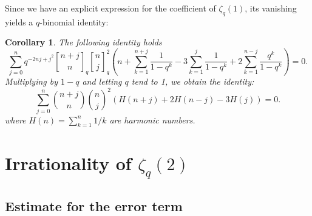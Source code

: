 \documentclass[12pt]{article}
\newtheorem{corollary}[theorem]{Corollary}
\def \qbinom#1#2{\genfrac{[}{]}{0pt}{}{#1}{#2}}
\numberwithin{equation}{section}
\begin{document}
Since we have an explicit expression for the coefficient of
$\zeta_q(1)$, its vanishing yields a $q$-binomial identity:
\begin{corollary}
The following identity holds
\[\sum_{j=0}^nq^{-2nj+j^2}\qbinom{n+j}{n}_q \qbinom{n}{j}_q^2
\left(n+\sum_{k=1}^{n+j}\frac{1}{1-q^k}-3\sum_{k=1}^j\frac{1}{1-q^k}+2\sum_{k=1}^{n-j}\frac{q^k}{1-q^k}\right) = 0.\]
Multiplying by $1-q$ and letting $q$ tend to 1, we obtain the identity:
\[\sum_{j=0}^n\binom{n+j}{n}\binom{n}{j}^2\left(H(n+j)+2H(n-j)-3H(j)\right) = 0. \]
where $H(n)=\sum_{k=1}^n 1/k$ are harmonic numbers.
\end{corollary}

\section{Irrationality of \textbf{$\zeta_{q}(2)$}}
\subsection{Estimate for the error term}
\end{document}
